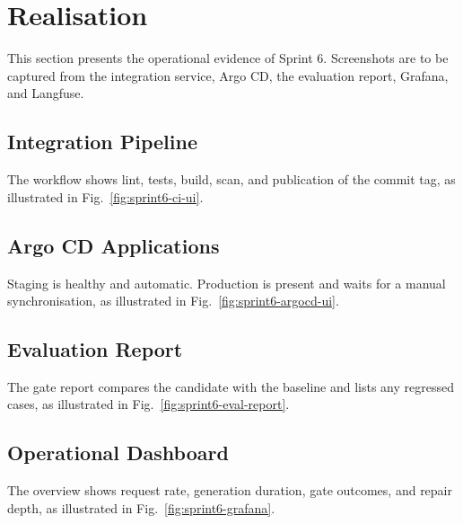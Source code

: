 \section{Realisation}

This section presents the operational evidence of Sprint 6. Screenshots are to be captured from the integration service, Argo CD, the evaluation report, Grafana, and Langfuse.

\subsection{Integration Pipeline}

The workflow shows lint, tests, build, scan, and publication of the commit tag, as illustrated in Fig.~\ref{fig:sprint6-ci-ui}.


\subsection{Argo CD Applications}

Staging is healthy and automatic. Production is present and waits for a manual synchronisation, as illustrated in Fig.~\ref{fig:sprint6-argocd-ui}.


\subsection{Evaluation Report}

The gate report compares the candidate with the baseline and lists any regressed cases, as illustrated in Fig.~\ref{fig:sprint6-eval-report}.


\subsection{Operational Dashboard}

The overview shows request rate, generation duration, gate outcomes, and repair depth, as illustrated in Fig.~\ref{fig:sprint6-grafana}.


